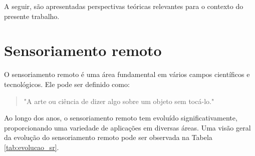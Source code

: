 A seguir, são apresentadas perspectivas teóricas relevantes para o contexto do presente
trabalho.
\section{Sensoriamento remoto}
O sensoriamento remoto é uma área fundamental em vários campos científicos e tecnológicos. Ele pode ser definido  como:
\begin{quote}
"A arte ou ciência de dizer algo sobre um objeto sem tocá-lo." \parencite[{p. 34}]{fischer1976}
\end{quote}

Ao longo dos anos, o sensoriamento remoto tem evoluído significativamente, proporcionando uma variedade de aplicações em diversas áreas. Uma visão geral da evolução do sensoriamento remoto pode ser observada na Tabela \ref{tab:evolucao_sr}.

